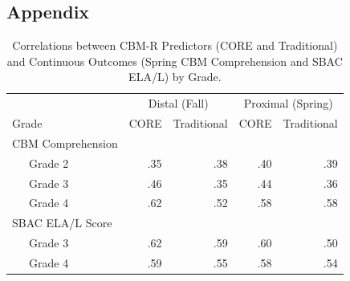 \documentclass[
  english,
  man, fleqn, noextraspace]{apa6}
\begin{document}
\endgroup


\clearpage
\makeatletter
\efloat@restorefloats
\makeatother


\begin{appendix}
\hypertarget{appendix}{%
\section{Appendix}\label{appendix}}





\begin{table}[tbp]

\begin{center}
\begin{threeparttable}

\caption{\label{tab:tbl-cor}Correlations between CBM-R Predictors (CORE and
Traditional) and Continuous Outcomes (Spring CBM Comprehension and SBAC
ELA/L) by Grade.}

\begin{tabular}{lrrrr}
\toprule
& \multicolumn{2}{c}{Distal (Fall)} & \multicolumn{2}{c}{Proximal (Spring)} \\
\cmidrule(r){2-3} \cmidrule(r){4-5}
Grade & \multicolumn{1}{c}{CORE} & \multicolumn{1}{c}{Traditional} & \multicolumn{1}{c}{CORE} & \multicolumn{1}{c}{Traditional}\\
\midrule
CBM Comprehension &  &  &  & \\
\ \ \ Grade 2 & .35 & .38 & .40 & .39\\
\ \ \ Grade 3 & .46 & .35 & .44 & .36\\
\ \ \ Grade 4 & .62 & .52 & .58 & .58\\
SBAC ELA/L Score &  &  &  & \\
\ \ \ Grade 3 & .62 & .59 & .60 & .50\\
\ \ \ Grade 4 & .59 & .55 & .58 & .54\\
\bottomrule
\end{tabular}

\end{threeparttable}
\end{center}

\end{table}




\begin{center}
\begin{ThreePartTable}


\end{ThreePartTable}
\end{center}
\end{appendix}
\end{document}
